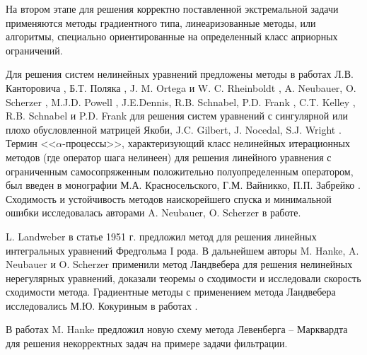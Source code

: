 {На втором этапе для решения корректно поставленной экстремальной задачи применяются методы градиентного типа, линеаризованные методы, или алгоритмы, специально ориентированные на определенный класс априорных ограничений.

Для решения систем нелинейных уравнений предложены методы в работах Л.В. Канторовича \cite{Kan1947}, Б.Т. Поляка \cite{Pol1969}, J. M. Ortega и W. C. Rheinboldt \cite{OrtRhe1970}, A. Neubauer, O. Scherzer \cite{NeuSch1995_1, Sch1995}, M.J.D. Powell \cite{Pow1970}, J.E.Dennis, R.B. Schnabel, P.D. Frank \cite{DenSchn1996}, C.T. Kelley \cite{Kel1995}, R.B. Schnabel и P.D. Frank \cite{SchnFra1983} для решения систем уравнений с сингулярной или плохо обусловленной матрицей Якоби, J.C. Gilbert, J. Nocedal, S.J. Wright \cite{GilNoc1991, NocWri2006}. Термин <<$\alpha$-процессы>>, характеризующий класс нелинейных итерационных методов (где оператор шага нелинеен) для решения линейного уравнения с ограниченным самосопряженным положительно полуопределенным оператором, был введен в монографии М.А. Красносельского, Г.М. Вайникко, П.П. Забрейко \cite{KraVayZab1969}. Сходимость и устойчивость методов наискорейшего спуска и минимальной ошибки исследовалась авторами A. Neubauer, O. Scherzer в работе\cite{NeuSch1995_2}.

L. Landweber в статье \cite{Lan1951} 1951 г. предложил метод для решения линейных интегральных уравнений Фредгольма I рода. В дальнейшем авторы M. Hanke, A. Neubauer и O. Scherzer \cite{HanNeuSch1995,Neu2000,NeuSch1995_2} применили метод Ландвебера для решения нелинейных нерегулярных уравнений, доказали теоремы о сходимости и исследовали скорость сходимости метода. Градиентные методы с применением метода Ландвебера исследовались М.Ю. Кокуриным в работах \cite{Kok2010_1,Kok2010_2}.

В работах \cite{Han1997,Han2010} M. Hanke предложил новую схему метода Левенберга -- Марквардта для решения некорректных задач на примере задачи фильтрации.

}
